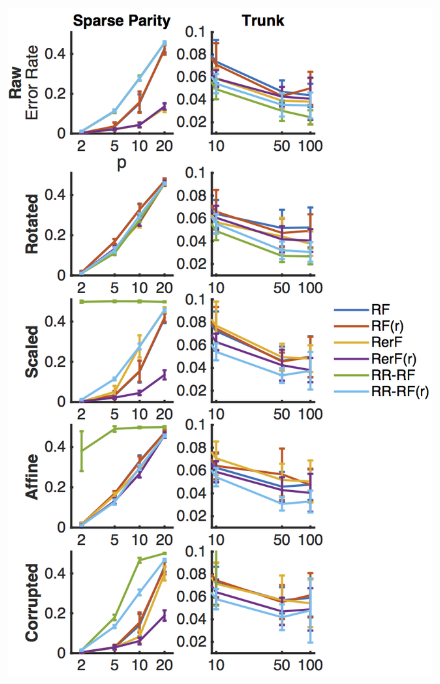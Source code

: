 \documentclass[simplex.tex]{subfiles}
\begin{document}
\begin{figure}[h!]
\begin{cframed}
\centering
\includegraphics[height=0.5\textheight]{../../figs/RefF1.png}

\end{cframed}
\end{figure}
\end{document}
